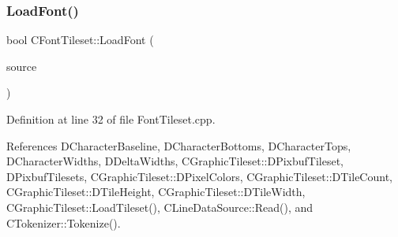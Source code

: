 \subsubsection{\texorpdfstring{Load\+Font()}{LoadFont()}}
{\footnotesize\ttfamily bool C\+Font\+Tileset\+::\+Load\+Font (\begin{DoxyParamCaption}\item[{std\+::shared\+\_\+ptr$<$ \hyperlink{classCDataSource}{C\+Data\+Source} $>$}]{source }\end{DoxyParamCaption})}



Definition at line 32 of file Font\+Tileset.\+cpp.



References D\+Character\+Baseline, D\+Character\+Bottoms, D\+Character\+Tops, D\+Character\+Widths, D\+Delta\+Widths, C\+Graphic\+Tileset\+::\+D\+Pixbuf\+Tileset, D\+Pixbuf\+Tilesets, C\+Graphic\+Tileset\+::\+D\+Pixel\+Colors, C\+Graphic\+Tileset\+::\+D\+Tile\+Count, C\+Graphic\+Tileset\+::\+D\+Tile\+Height, C\+Graphic\+Tileset\+::\+D\+Tile\+Width, C\+Graphic\+Tileset\+::\+Load\+Tileset(), C\+Line\+Data\+Source\+::\+Read(), and C\+Tokenizer\+::\+Tokenize().



